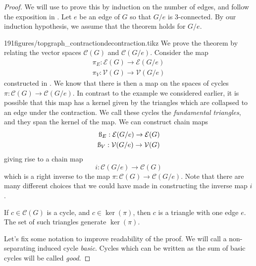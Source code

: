 \begin{proof}We will use  to prove this by induction on the number of edges, and follow the exposition in \cite{diestel2000graph}. Let $e$ be an edge of $G$ so that $G/e$ is 3-connected. 
	By our induction hypothesis, we assume that the theorem holds for $G/e$.
	\begin{paragraphfigureenv}{191figures/topgraph_contractiondecontraction.tikz}
	We prove the theorem by relating the vector spaces  $\mathcal C(G)$ and $\mathcal C (G/e)$. 
Consider the map 
\begin{align*}
	\pi_E:\mathcal E(G)\to \mathcal E(G/e)\\
	\pi_V:\mathcal V(G)\to \mathcal V(G/e)
\end{align*}
constructed in . 
We know that there is then a map on the spaces of cycles $\pi: \mathcal C(G)\to \mathcal C(G/e)$. 
In contrast to the example we considered earlier, it is possible that this map has a kernel given by the triangles which are collapsed to an edge under the contraction. 
We call these cycles the \emph{fundamental triangles}, and they span the kernel of the map. 
We can construct chain maps
\begin{align*}
	\i_E:\mathcal E(G/e)\to \mathcal E(G)\\
	\i_V:\mathcal V(G/e)\to \mathcal V(G)
\end{align*}
giving rise to a chain map
\[i:\mathcal C(G/e)\to \mathcal C(G)\]
which is a right inverse to the map $\pi: \mathcal C(G)\to \mathcal C(G/e)$. 
Note that there are many different choices that we could have made in constructing the inverse map $i$. 
\end{paragraphfigureenv}
\begin{claim}
	If $c\in \mathcal C(G)$ is a cycle, and $c\in \ker(\pi)$, then $c$ is a triangle with one edge $e$. The set of such triangles generate $\ker(\pi)$. 
\end{claim}

Let's fix some notation to improve readability of the proof.
 We will call a non-separating induced cycle \emph{basic}.
 Cycles which can be written as the sum of basic cycles will be called \emph{good}. 


\end{proof}
